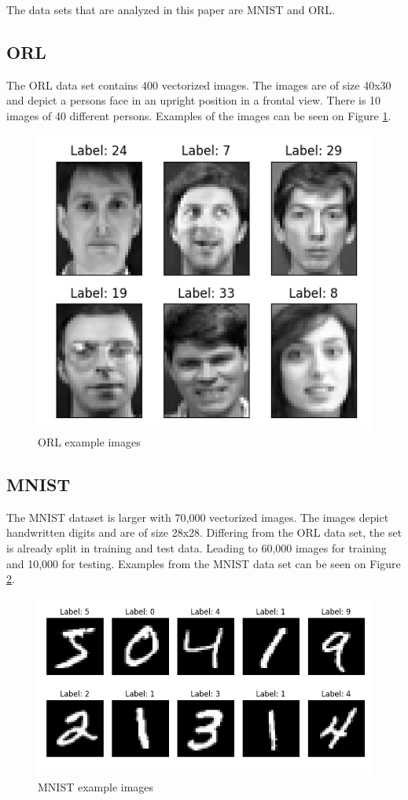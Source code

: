The data sets that are analyzed in this paper are MNIST and ORL. 

\subsection{ORL}
The ORL data set contains 400 vectorized images. The images are of size 40x30 and depict a persons face in an upright position in a frontal view\cite{orl_images}. There is 10 images of 40 different persons. Examples of the images can be seen on Figure \ref{fig:orl-images-raw}.

\begin{figure}[htbp]
    \centering
    \includegraphics[width=0.7\columnwidth]{../source/orl/pictures/image-before-pca.png}
    \caption{ORL example images}
    \label{fig:orl-images-raw}
\end{figure}

\subsection{MNIST}
The MNIST dataset is larger with 70,000 vectorized images. The images depict handwritten digits and are of size 28x28. Differing from the ORL data set, the set is already split in training and test data. Leading to 60,000 images for training and 10,000 for testing. Examples from the MNIST data set can be seen on Figure \ref{fig:mnist-images-raw}.  

\begin{figure}[htbp]
    \centering
    \includegraphics[width=0.7\columnwidth]{../source/mnist/pictures/image-before-pca.png}
    \caption{MNIST example images}
    \label{fig:mnist-images-raw}
\end{figure}